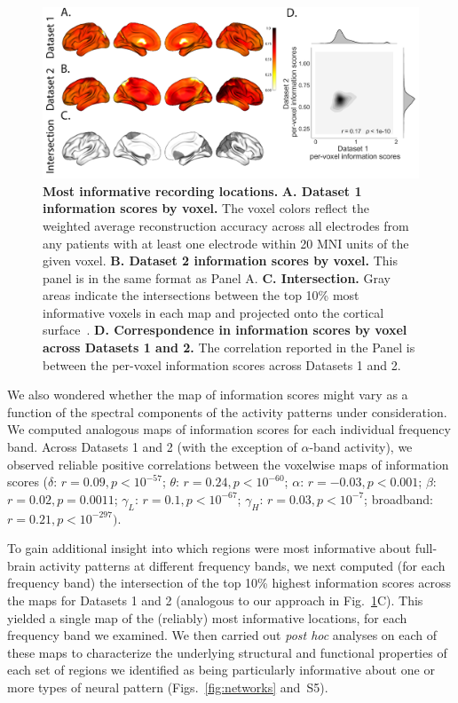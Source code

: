 \documentclass[11pt]{article}
\newcommand{\networkpower}{S5}
\begin{document}
\begin{figure}
  \centering \includegraphics[width=\textwidth]{figs/informap}
  \caption{\textbf{Most informative recording locations.} \textbf{A. Dataset 1
  information scores by voxel.} The voxel colors reflect the weighted average
  reconstruction accuracy across all electrodes from any patients with at least
  one electrode within 20 MNI units of the given voxel.  \textbf{B. Dataset 2
  information scores by voxel.}  This panel is in the same format as Panel A.
  \textbf{C. Intersection.} Gray areas indicate the intersections between the
  top 10\% most informative voxels in each map and projected onto the cortical
  surface~\citep{CombEtal19}. \textbf{D. Correspondence in information scores by
  voxel across Datasets 1 and 2.}  The correlation reported in the Panel is
  between the per-voxel information scores across Datasets 1 and 2.}
  \label{fig:informap}
\end{figure}

We also wondered whether the map of information scores might vary as a function
of the spectral components of the activity patterns under consideration.  We
computed analogous maps of information scores for each individual frequency
band. Across Datasets 1 and 2 (with the exception of $\alpha$-band activity),
we observed reliable positive correlations between the voxelwise maps of
information scores ($\delta$: $r = 0.09, p < 10^{-57}$; $\theta$: $r = 0.24, p <
10^{-60}$; $\alpha$: $r = -0.03, p < 0.001$; $\beta$: $r = 0.02, p = 0.0011$;
$\gamma_L$: $r = 0.1, p < 10^{-67}$; $\gamma_H$: $r = 0.03, p < 10^{-7}$;
broadband: $r = 0.21, p < 10^{-297})$.

To gain additional insight into which regions were most informative about
full-brain activity patterns at different frequency bands, we next computed (for
each frequency band) the intersection of the top 10\% highest information scores
across the maps for Datasets 1 and 2 (analogous to our approach in
Fig.~\ref{fig:informap}C). This yielded a single map of the (reliably) most
informative locations, for each frequency band we examined. We then carried out
\textit{post hoc} analyses on each of these maps to characterize the underlying
structural and functional properties of each set of regions we identified as
being particularly informative about one or more types of neural
pattern (Figs.~\ref{fig:networks} and~\networkpower).
\end{document}

